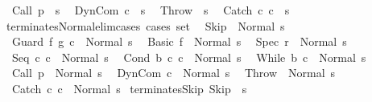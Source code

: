 \begin{isabellebody}
\ \ {\isachardoublequoteopen}{\isasymGamma}{\isasymturnstile}Call\ p\ {\isasymdown}\ s{\isachardoublequoteclose}\isanewline
\ \ {\isachardoublequoteopen}{\isasymGamma}{\isasymturnstile}DynCom\ c\ {\isasymdown}\ s{\isachardoublequoteclose}\isanewline
\ \ {\isachardoublequoteopen}{\isasymGamma}{\isasymturnstile}Throw\ {\isasymdown}\ s{\isachardoublequoteclose}\isanewline
\ \ {\isachardoublequoteopen}{\isasymGamma}{\isasymturnstile}Catch\ c{}\ c{}\ {\isasymdown}\ s{\isachardoublequoteclose}\isanewline
\isanewline
{}\isamarkupfalse%
\ terminates{\isacharunderscore}Normal{\isacharunderscore}elim{\isacharunderscore}cases\ {\isacharbrackleft}cases\ set{\isacharbrackright}{\isacharcolon}\isanewline
\ \ {\isachardoublequoteopen}{\isasymGamma}{\isasymturnstile}Skip\ {\isasymdown}\ Normal\ s{\isachardoublequoteclose}\isanewline
\ \ {\isachardoublequoteopen}{\isasymGamma}{\isasymturnstile}Guard\ f\ g\ c\ {\isasymdown}\ Normal\ s{\isachardoublequoteclose}\isanewline
\ \ {\isachardoublequoteopen}{\isasymGamma}{\isasymturnstile}Basic\ f\ {\isasymdown}\ Normal\ s{\isachardoublequoteclose}\isanewline
\ \ {\isachardoublequoteopen}{\isasymGamma}{\isasymturnstile}Spec\ r\ {\isasymdown}\ Normal\ s{\isachardoublequoteclose}\isanewline
\ \ {\isachardoublequoteopen}{\isasymGamma}{\isasymturnstile}Seq\ c{}\ c{}\ {\isasymdown}\ Normal\ s{\isachardoublequoteclose}\isanewline
\ \ {\isachardoublequoteopen}{\isasymGamma}{\isasymturnstile}Cond\ b\ c{}\ c{}\ {\isasymdown}\ Normal\ s{\isachardoublequoteclose}\isanewline
\ \ {\isachardoublequoteopen}{\isasymGamma}{\isasymturnstile}While\ b\ c\ {\isasymdown}\ Normal\ s{\isachardoublequoteclose}\isanewline
\ \ {\isachardoublequoteopen}{\isasymGamma}{\isasymturnstile}Call\ p\ {\isasymdown}\ Normal\ s{\isachardoublequoteclose}\isanewline
\ \ {\isachardoublequoteopen}{\isasymGamma}{\isasymturnstile}DynCom\ c\ {\isasymdown}\ Normal\ s{\isachardoublequoteclose}\isanewline
\ \ {\isachardoublequoteopen}{\isasymGamma}{\isasymturnstile}Throw\ {\isasymdown}\ Normal\ s{\isachardoublequoteclose}\isanewline
\ \ {\isachardoublequoteopen}{\isasymGamma}{\isasymturnstile}Catch\ c{}\ c{}\ {\isasymdown}\ Normal\ s{\isachardoublequoteclose}\isanewline
\isanewline
{}\isamarkupfalse%
\ terminates{\isacharunderscore}Skip{\isacharprime}{\isacharcolon}\ {\isachardoublequoteopen}{\isasymGamma}{\isasymturnstile}Skip\ {\isasymdown}\ s{\isachardoublequoteclose}\isanewline
%
\isadelimproof
\ \ %
\endisadelimproof
%

\end{isabellebody}
